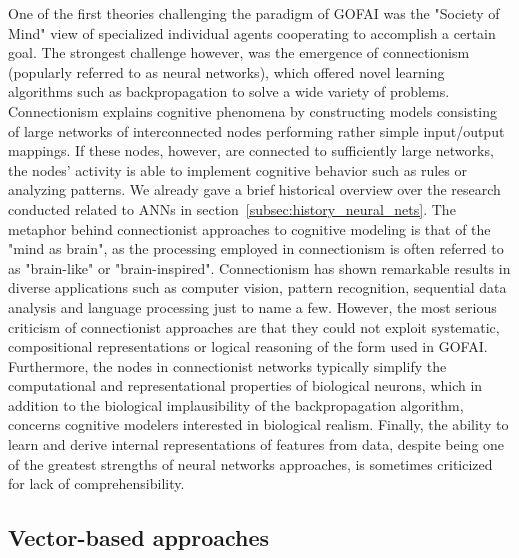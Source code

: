 One of the first theories challenging the paradigm of \ac{GOFAI} was the "Society of Mind" \cite{Minsky1986} view of specialized individual agents cooperating to accomplish a certain goal.
The strongest challenge however, was the emergence of connectionism \cite{Rumelhart1986a} (popularly referred to as neural networks), which offered novel learning algorithms such as backpropagation \cite{Rumelhart1986} to solve a wide variety of problems.
Connectionism explains cognitive phenomena by constructing models consisting of large networks of interconnected nodes performing rather simple input/output mappings.
If these nodes, however, are connected to sufficiently large networks, the nodes' activity is able to implement cognitive behavior such as rules or analyzing patterns.
We already gave a brief historical overview over the research conducted related to \acp{ANN} in section~\ref{subsec:history_neural_nets}. 
The metaphor behind connectionist approaches to cognitive modeling is that of the "mind as brain", as the processing employed in connectionism is often referred to as "brain-like" or "brain-inspired".
Connectionism has shown remarkable results in diverse applications such as computer vision, pattern recognition, sequential data analysis and language processing just to name a few.
However, the most serious criticism of connectionist approaches are that they could not exploit systematic, compositional representations or logical reasoning of the form used in \ac{GOFAI}. 
Furthermore, the nodes in connectionist networks typically simplify the computational and representational properties of biological neurons, which in addition to the biological implausibility of the backpropagation algorithm, concerns cognitive modelers interested in biological realism.
Finally, the ability to learn and derive internal representations of features from data, despite being one of the greatest strengths of neural networks approaches, is sometimes criticized for lack of comprehensibility.

\subsection{Vector-based approaches}%
\label{subsec:vector_based_approaches}

